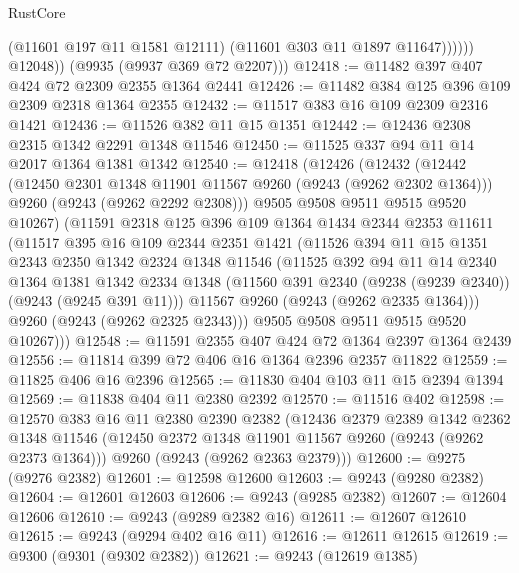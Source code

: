 \begin{lexlean}{RustCore}
\begin{coremodule}
                    (@11601 @197 @11 @1581 @12111)
                    (@11601 @303 @11 @1897 @11647))))))
          @12048))
      (@9935 (@9937 @369 @72 @2207)))
@12418 := @11482 @397 @407 @424 @72 @2309 @2355 @1364 @2441
@12426 := @11482 @384 @125 @396 @109 @2309 @2318 @1364 @2355
@12432 := @11517 @383 @16 @109 @2309 @2316 @1421
@12436 := @11526 @382 @11 @15 @1351
@12442 := @12436 @2308 @2315 @1342 @2291 @1348 @11546
@12450 := @11525 @337 @94 @11 @14 @2017 @1364 @1381 @1342
@12540 := @12418
    (@12426
      (@12432
        (@12442
          (@12450 @2301 @1348 @11901 @11567 @9260 (@9243 (@9262 @2302 @1364)))
          @9260
          (@9243 (@9262 @2292 @2308)))
        @9505
        @9508
        @9511
        @9515
        @9520
        @10267)
      (@11591
        @2318
        @125
        @396
        @109
        @1364
        @1434
        @2344
        @2353
        @11611
        (@11517
          @395
          @16
          @109
          @2344
          @2351
          @1421
          (@11526
            @394
            @11
            @15
            @1351
            @2343
            @2350
            @1342
            @2324
            @1348
            @11546
            (@11525
              @392
              @94
              @11
              @14
              @2340
              @1364
              @1381
              @1342
              @2334
              @1348
              (@11560 @391 @2340 (@9238 (@9239 @2340)) (@9243 (@9245 @391 @11)))
              @11567
              @9260
              (@9243 (@9262 @2335 @1364)))
            @9260
            (@9243 (@9262 @2325 @2343)))
          @9505
          @9508
          @9511
          @9515
          @9520
          @10267)))
@12548 := @11591 @2355 @407 @424 @72 @1364 @2397 @1364 @2439
@12556 := @11814 @399 @72 @406 @16 @1364 @2396 @2357 @11822
@12559 := @11825 @406 @16 @2396
@12565 := @11830 @404 @103 @11 @15 @2394 @1394
@12569 := @11838 @404 @11 @2380 @2392
@12570 := @11516 @402
@12598 := @12570
    @383
    @16
    @11
    @2380
    @2390
    @2382
    (@12436
      @2379
      @2389
      @1342
      @2362
      @1348
      @11546
      (@12450 @2372 @1348 @11901 @11567 @9260 (@9243 (@9262 @2373 @1364)))
      @9260
      (@9243 (@9262 @2363 @2379)))
@12600 := @9275 (@9276 @2382)
@12601 := @12598 @12600
@12603 := @9243 (@9280 @2382)
@12604 := @12601 @12603
@12606 := @9243 (@9285 @2382)
@12607 := @12604 @12606
@12610 := @9243 (@9289 @2382 @16)
@12611 := @12607 @12610
@12615 := @9243 (@9294 @402 @16 @11)
@12616 := @12611 @12615
@12619 := @9300 (@9301 (@9302 @2382))
@12621 := @9243 (@12619 @1385)

\end{coremodule}
\end{lexlean}
